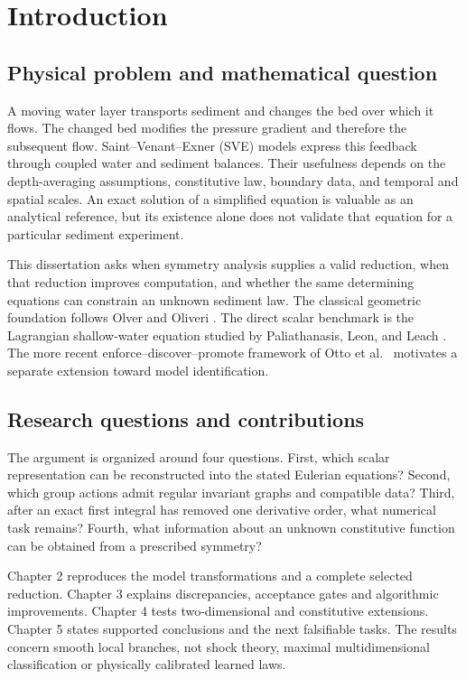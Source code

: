 \documentclass[11pt,a4paper,oneside]{report}
\numberwithin{equation}{chapter}
\begin{document}
\chapter{Introduction}\label{ch:intro}
\section{Physical problem and mathematical question}
A moving water layer transports sediment and changes the bed over which it flows. The changed bed modifies the pressure gradient and therefore the subsequent flow. Saint--Venant--Exner (SVE) models express this feedback through coupled water and sediment balances. Their usefulness depends on the depth-averaging assumptions, constitutive law, boundary data, and temporal and spatial scales. An exact solution of a simplified equation is valuable as an analytical reference, but its existence alone does not validate that equation for a particular sediment experiment.

This dissertation asks when symmetry analysis supplies a valid reduction, when that reduction improves computation, and whether the same determining equations can constrain an unknown sediment law. The classical geometric foundation follows Olver \cite{olver,olver1986} and Oliveri \cite{oliveri2026}. The direct scalar benchmark is the Lagrangian shallow-water equation studied by Paliathanasis, Leon, and Leach \cite{ap}. The more recent enforce--discover--promote framework of Otto et al.\ \cite{otto} motivates a separate extension toward model identification.

\section{Research questions and contributions}
The argument is organized around four questions. First, which scalar representation can be reconstructed into the stated Eulerian equations? Second, which group actions admit regular invariant graphs and compatible data? Third, after an exact first integral has removed one derivative order, what numerical task remains? Fourth, what information about an unknown constitutive function can be obtained from a prescribed symmetry?

Chapter 2 reproduces the model transformations and a complete selected reduction. Chapter 3 explains discrepancies, acceptance gates and algorithmic improvements. Chapter 4 tests two-dimensional and constitutive extensions. Chapter 5 states supported conclusions and the next falsifiable tasks. The results concern smooth local branches, not shock theory, maximal multidimensional classification or physically calibrated learned laws.
\end{document}
